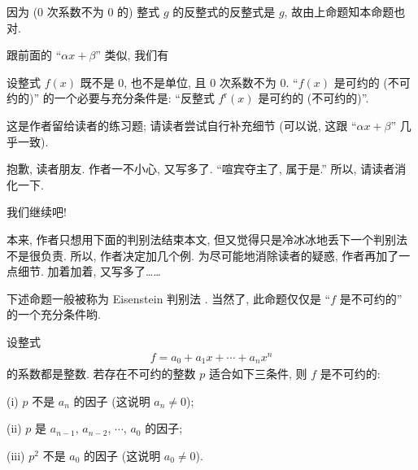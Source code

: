 \begin{pf}
    因为 ($0$ 次系数不为 $0$ 的) 整式 $g$ 的反整式的反整式是 $g$, 故由上命题知本命题也对.
\end{pf}

跟前面的 ``$\alpha x + \beta$'' 类似, 我们有
\begin{proposition}
    设整式 $f(x)$ 既不是 $0$, 也不是单位, 且 $0$ 次系数不为 $0$. ``$f(x)$ 是可约的 (不可约的)'' 的一个必要与充分条件是: ``反整式 $f^{\mathrm{r}} (x)$ 是可约的 (不可约的)''.
\end{proposition}

\begin{pf}
    这是作者留给读者的练习题; 请读者尝试自行补充细节 (可以说, 这跟 ``$\alpha x + \beta$'' 几乎一致).
\end{pf}

抱歉, 读者朋友. 作者一不小心, 又写多了. ``喧宾夺主了, 属于是.'' 所以, 请读者消化一下.

\myLine

我们继续吧!

本来, 作者只想用下面的判别法结束本文, 但又觉得只是冷冰冰地丢下一个判别法不是很负责. 所以, 作者决定加几个例. 为尽可能地消除读者的疑惑, 作者再加了一点细节. 加着加着, 又写多了……

下述命题一般被称为 Eisenstein 判别法 . 当然了, 此命题仅仅是 ``$f$ 是不可约的'' 的一个充分条件哟.

\begin{proposition}
    设整式
    \begin{align*}
        f = a_0 + a_1 x + \cdots + a_n x^n
    \end{align*}
    的系数都是整数. 若存在不可约的整数 $p$ 适合如下三条件, 则 $f$ 是不可约的:

    (i) $p$ 不是 $a_n$ 的因子 (这说明 $a_n \neq 0$);

    (ii) $p$ 是 $a_{n-1}$, $a_{n-2}$, $\cdots$, $a_0$ 的因子;

    (iii) $p^2$ 不是 $a_0$ 的因子 (这说明 $a_0 \neq 0$).
\end{proposition}

